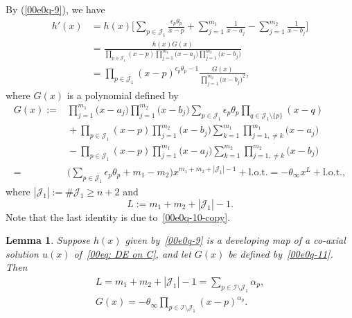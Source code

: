\documentclass[10pt,a4paper]{amsart}
\numberwithin{equation}{section}
\newtheorem{Lemma}[Theorem]{Lemma}
\begin{document}
By (\ref{00e0q-9}), we have
{\allowdisplaybreaks
\begin{align}\label{00e0q-11-copy}
h'(x)&=h(x)\Bigg[\sum_{p\in \mathcal{J}_1}\frac{\epsilon_{p}\theta_{p}}{x-p}
+\sum_{j=1}^{m_1}\frac{1}{x-a_j}-\sum_{j=1}^{m_2}\frac{1}{x-b_j}\Bigg]\nonumber\\
&=\frac{h(x)G(x)}{\prod_{p\in\mathcal{J}_1}(x-p)\prod_{j=1}^{m_1}\bigl(x-a_j\bigr)\prod_{j=1}^{m_2}\bigl(x-b_j\bigr)}\nonumber\\
&=\prod_{p\in \mathcal{J}_1}(x-p)^{\epsilon_{p}\theta_{p}-1}\frac{G(x)}{\prod_{j=1}^{m_2}\bigl(x-b_j\bigr)^2},
\end{align}
}%
where $G(x)$ is a polynomial defined by
{\allowdisplaybreaks
\begin{align}
G(x):={}&%
\prod_{j=1}^{m_1}\bigl(x-a_j\bigr)\prod_{j=1}^{m_2}\bigl(x-b_j\bigr)\sum_{p\in \mathcal{J}_1}\epsilon_{p}\theta_{p}\prod_{q\in\mathcal{J}_1\setminus\{p\}}(x-q)\nonumber\\
&{}+\prod_{p\in \mathcal{J}_1}(x-p)\prod_{j=1}^{m_2}\bigl(x-b_j\bigr)\sum_{k=1}^{m_1}\prod_{j=1,\neq k}^{m_1}\bigl(x-a_j\bigr)\nonumber\\
&{}-\prod_{p\in \mathcal{J}_1}(x-p)\prod_{j=1}^{m_1}\bigl(x-a_j\bigr)\sum_{k=1}^{m_2}\prod_{j=1,\neq k}^{m_2}\bigl(x-b_j\bigr)\nonumber\\
={}&\biggl(\sum_{p\in \mathcal{J}_1}\epsilon_{p}\theta_{p}+m_1-m_2\biggr)x^{m_1+m_2+|\mathcal{J}_1|-1}+\text{l.o.t.}
= -\theta_{\infty}x^{L}+\text{l.o.t.},\label{00e0q-11}
\end{align}
}%
where $|\mathcal{J}_1|:=\#\mathcal{J}_1\geq n+2$ and
\begin{equation*}
L:=m_1+m_2+|\mathcal{J}_1|-1.
\end{equation*}
Note that the last identity is due to~\eqref{00e0q-10-copy}.

\begin{Lemma}
Suppose $h(x)$ given by~\eqref{00e0q-9} is a developing map of a co-axial solution $u(x)$ of~\eqref{00eq: DE on C}, and let $G(x)$ be defined by~\eqref{00e0q-11}. Then
\begin{gather}
\label{00e0q-13-copy}L=m_1+m_2+|\mathcal{J}_1|-1=\sum_{p\in \mathcal{I}\setminus\mathcal{J}_1}{\alpha}_{p},\\
\label{00e0q-12-copy}G(x)=-\theta_\infty \prod_{p\in\mathcal{I}\setminus \mathcal{J}_1}(x-p)^{{\alpha}_{p}}.
\end{gather}
\end{Lemma}
\end{document}
